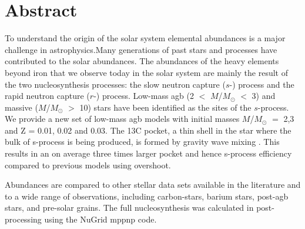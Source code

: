 \chapter{Abstract}

To understand the origin of the solar system elemental abundances is a major challenge in astrophysics.Many generations of past stars and processes have contributed to the solar abundances. The abundances of the heavy elements beyond iron that we observe today in the solar system are mainly the result of the two nucleosynthesis processes: the slow neutron capture ($s$-) process and the rapid neutron capture ($r$-) process. Low-mass \acrfull{agb} (2 $<$ $M$/$M_\odot$ $<$ 3) and massive ($M$/$M_\odot$ $>$ 10) stars have been identified as the sites of the $s$-process. We provide a new set of low-mass \acrshort{agb} models with initial masses $M$/$M_\odot$ $=$ 2,3 and Z = 0.01, 0.02 and 0.03. 
The 13C pocket, a thin shell in the star where the bulk of s-process is being produced, is formed by gravity wave mixing . This results in an on average three times larger pocket and hence s-process efficiency compared to previous models using overshoot.

Abundances are compared to other stellar data sets available in the literature and to a wide range of observations, including carbon-stars, barium stars, post-\acrshort{agb} stars, and pre-solar grains. The full nucleosynthesis was calculated in post-processing using the NuGrid mppnp code.






